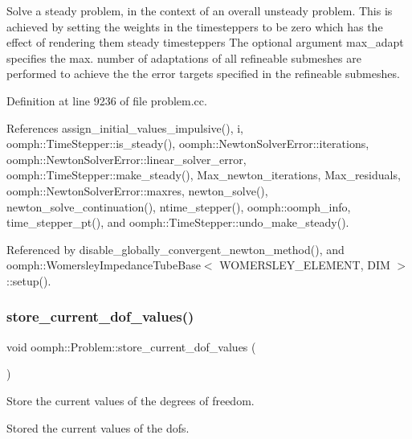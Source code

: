 Solve a steady problem, in the context of an overall unsteady problem. This is achieved by setting the weights in the timesteppers to be zero which has the effect of rendering them steady timesteppers The optional argument max\+\_\+adapt specifies the max. number of adaptations of all refineable submeshes are performed to achieve the the error targets specified in the refineable submeshes. 

Definition at line 9236 of file problem.\+cc.



References assign\+\_\+initial\+\_\+values\+\_\+impulsive(), i, oomph\+::\+Time\+Stepper\+::is\+\_\+steady(), oomph\+::\+Newton\+Solver\+Error\+::iterations, oomph\+::\+Newton\+Solver\+Error\+::linear\+\_\+solver\+\_\+error, oomph\+::\+Time\+Stepper\+::make\+\_\+steady(), Max\+\_\+newton\+\_\+iterations, Max\+\_\+residuals, oomph\+::\+Newton\+Solver\+Error\+::maxres, newton\+\_\+solve(), newton\+\_\+solve\+\_\+continuation(), ntime\+\_\+stepper(), oomph\+::oomph\+\_\+info, time\+\_\+stepper\+\_\+pt(), and oomph\+::\+Time\+Stepper\+::undo\+\_\+make\+\_\+steady().



Referenced by disable\+\_\+globally\+\_\+convergent\+\_\+newton\+\_\+method(), and oomph\+::\+Womersley\+Impedance\+Tube\+Base$<$ W\+O\+M\+E\+R\+S\+L\+E\+Y\+\_\+\+E\+L\+E\+M\+E\+N\+T, D\+I\+M $>$\+::setup().

\mbox{\label{classoomph_1_1Problem_a5a2906b9a6a22445d1dbb8aebbce9fa7}} 
\subsubsection{\texorpdfstring{store\+\_\+current\+\_\+dof\+\_\+values()}{store\_current\_dof\_values()}}
{\footnotesize\ttfamily void oomph\+::\+Problem\+::store\+\_\+current\+\_\+dof\+\_\+values (\begin{DoxyParamCaption}{ }\end{DoxyParamCaption})}



Store the current values of the degrees of freedom. 

Stored the current values of the dofs. 

